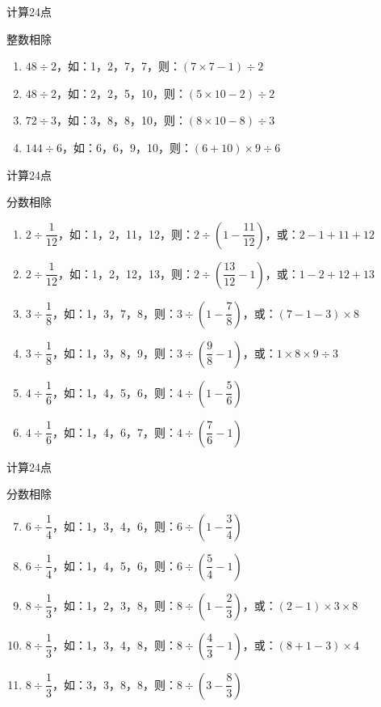 \documentclass[aspectratio=169]{ctexbeamer} %
\begin{document}
\begin{frame}[t]{计算24点}
\begin{spacing}{2.5}
\normalsize
\alert{整数相除}
\begin{enumerate}[label={\arabic*.}]
\item $48 \div 2$，如：1，2，7，7，则：$(7 \times 7 - 1) \div 2$
\item $48 \div 2$，如：2，2，5，10，则：$(5 \times 10 - 2) \div 2$
\item $72 \div 3$，如：3，8，8，10，则：$(8 \times 10 - 8) \div 3$
\item  $144 \div 6$，如：6，6，9，10，则：$(6 + 10) \times 9 \div 6$
\end{enumerate}
\end{spacing}
\end{frame}

\begin{frame}[t]{计算24点}
\begin{spacing}{2.0}
\normalsize
\alert{分数相除}
\begin{enumerate}[label={\arabic*.}]
\item $2 \div \dfrac{1}{12}$，如：1，2，11，12，则：$2 \div (1- \dfrac{11}{12})$，或：$2 - 1 + 11 + 12$
\item $2 \div \dfrac{1}{12}$，如：1，2，12，13，则：$2 \div (\dfrac{13}{12} - 1)$，或：$1 - 2 + 12 + 13$
\item $3 \div \dfrac{1}{8}$，如：1，3，7，8，则：$3 \div (1 - \dfrac{7}{8})$，或：$(7 - 1 - 3) \times 8$
\item $3 \div \dfrac{1}{8}$，如：1，3，8，9，则：$3 \div (\dfrac{9}{8} - 1)$，或：$1 \times 8 \times 9 \div 3$
\item $4 \div \dfrac{1}{6}$，如：1，4，5，6，则：$4 \div (1 - \dfrac{5}{6})$
\item $4 \div \dfrac{1}{6}$，如：1，4，6，7，则：$4 \div (\dfrac{7}{6} - 1)$
\end{enumerate}
\end{spacing}
\end{frame}

\begin{frame}[t]{计算24点}
\begin{spacing}{2.0}
\normalsize
\alert{分数相除}
\begin{enumerate}[label={\arabic*.}]
\setcounter{enumi}{6}
\item $6 \div \dfrac{1}{4}$，如：1，3，4，6，则：$6 \div (1- \dfrac{3}{4})$
\item $6 \div \dfrac{1}{4}$，如：1，4，5，6，则：$6 \div (\dfrac{5}{4} - 1)$
\item $8 \div \dfrac{1}{3}$，如：1，2，3，8，则：$8 \div (1 - \dfrac{2}{3})$，或：$(2 - 1) \times 3 \times 8$
\item $8 \div \dfrac{1}{3}$，如：1，3，4，8，则：$8 \div (\dfrac{4}{3} - 1)$，或：$(8 + 1 - 3) \times 4$
\item $8 \div \dfrac{1}{3}$，如：3，3，8，8，则：$8 \div (3 - \dfrac{8}{3})$
\end{enumerate}
\end{spacing}
\end{frame}
\end{document}
